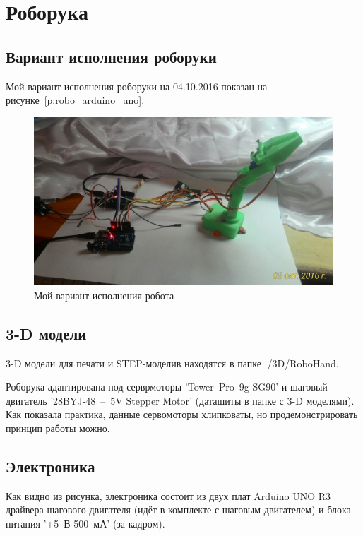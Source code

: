 \section{Роборука}

\subsection{Вариант исполнения роборуки}

Мой вариант исполнения роборуки на 04.10.2016 показан на рисунке~\ref{p:robo_arduino_uno}.

\begin{figure}[H]\center
  \captionsetup{singlelinecheck=true} %
  \includegraphics*[scale=0.15]{about/images/robohand/robohand_system.jpg}
  \caption{Мой вариант исполнения робота} \label{p:robohand_system}
\end{figure}


\subsection{3-D модели}

3-D модели для печати и STEP-моделив находятся в папке ./3D/RoboHand.

Роборука адаптирована под серврмоторы 'Tower~Pro~9g SG90' и шаговый двигатель '28BYJ-48~–~5V Stepper Motor' (даташиты в папке с 3-D моделями). Как показала практика, данные сервомоторы хлипковаты, но продемонстрировать принцип работы можно.


\subsection{Электроника}

Как видно из рисунка, электроника состоит из двух плат Arduino UNO R3 драйвера шагового двигателя (идёт в комплекте с шаговым двигателем) и блока питания '+5~В  500~мА' (за кадром).

